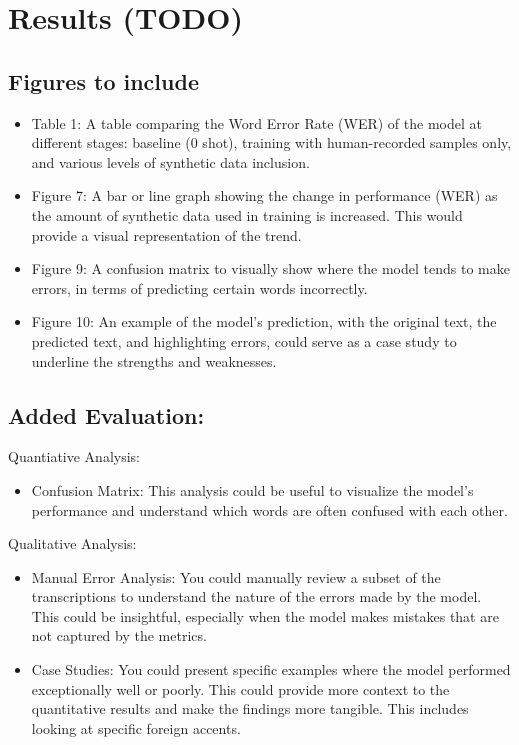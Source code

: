 \documentclass[
]{article}
\author{}
\date{}
\providecommand{\tightlist}{%
  \setlength{\itemsep}{0pt}\setlength{\parskip}{0pt}}
\begin{document}
\hypertarget{results-todo}{%
\section{Results (TODO)}\label{results-todo}}

\hypertarget{figures-to-include}{%
\subsection{Figures to include}\label{figures-to-include}}

\begin{itemize}
\tightlist
\item
  Table 1: A table comparing the Word Error Rate (WER) of the model at
  different stages: baseline (0 shot), training with human-recorded
  samples only, and various levels of synthetic data inclusion.
\item
  Figure 7: A bar or line graph showing the change in performance (WER)
  as the amount of synthetic data used in training is increased. This
  would provide a visual representation of the trend.
\item
  Figure 9: A confusion matrix to visually show where the model tends to
  make errors, in terms of predicting certain words incorrectly.
\item
  Figure 10: An example of the model's prediction, with the original
  text, the predicted text, and highlighting errors, could serve as a
  case study to underline the strengths and weaknesses.
\end{itemize}

\hypertarget{added-evaluation}{%
\subsection{Added Evaluation:}\label{added-evaluation}}

Quantiative Analysis:

\begin{itemize}
\tightlist
\item
  Confusion Matrix: This analysis could be useful to visualize the
  model's performance and understand which words are often confused with
  each other.
\end{itemize}

Qualitative Analysis:

\begin{itemize}
\item
  Manual Error Analysis: You could manually review a subset of the
  transcriptions to understand the nature of the errors made by the
  model. This could be insightful, especially when the model makes
  mistakes that are not captured by the metrics.
\item
  Case Studies: You could present specific examples where the model
  performed exceptionally well or poorly. This could provide more
  context to the quantitative results and make the findings more
  tangible. This includes looking at specific foreign accents.
\end{itemize}
\end{document}
